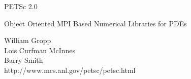 %
%
\def\stripe{\ifvmode\else\par\vskip-\baselineskip\vskip12pt\fi
\hbox to \hsize{\leaders\hrule height 4.5pt\hfil}\vskip-\baselineskip
            \vskip 3.5pt
            \hbox to \hsize{\leaders\hrule height 1.5pt\hfil}
            \vskip -10pt}
\def\vt{\protect\begin{slide}}
\def\ve{\vfil\protect\end{slide}}
\def\vtt#1{\begin{slide}{}{\bf #1}\stripe\vfil\parskip8pt}
\def\vttstar#1{\begin{slide*}{}{\bf #1}\stripe\vfil\parskip8pt}
\def\vestar{\vfil\protect\end{slide*}}

\landscapeonly



\vt
\thispagestyle{empty}

\begin{center}
\Red {}
{\Huge \hspace{-1.5in} PETSc 2.0 } \\
\vspace{.4in}
{\Large Object Oriented MPI Based Numerical Libraries for PDEs}\\
\end{center}

\begin{center}
\Blue
William Gropp\\
Lois Curfman McInnes \\
Barry Smith\\
\Cyan
{\Large http://www.mcs.anl.gov/petsc/petsc.html}\\
\Black
\end{center}
\vspace{0cm}
\centerline{\hspace{.75in} }
\ve


